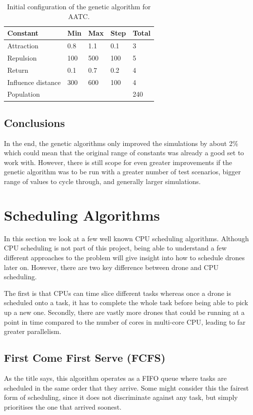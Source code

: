 \documentclass[a4paper,11pt,titlepage]{report}
\begin{document}
\begin{table}[!hbpt]
\centering
\begin{tabular}{|l|l|l|l|l|}
\hline
Constant           & Min & Max & Step & Total \\ \hline
Attraction         & 0.8 & 1.1 & 0.1    & 3     \\ \hline
Repulsion          & 100 & 500 & 100  & 5     \\ \hline
Return             & 0.1 & 0.7 & 0.2  & 4     \\ \hline
Influence distance & 300 & 600 & 100  & 4     \\ \hline
\multicolumn{4}{|l|}{Population}      & 240   \\ \hline
\end{tabular}
\caption{Initial configuration of the genetic algorithm for AATC. \cite{Balaji2017}}
\label{tab:gen_alg}
\end{table}

\subsection{Conclusions}
In the end, the genetic algorithms only improved the simulations by about 2\%\cite{Balaji2017} which could mean that the original range of constants was already a good set to work with. However, there is still scope for even greater improvements if the genetic algorithm was to be run with a greater number of test scenarios, bigger range of values to cycle through, and generally larger simulations.

\section{Scheduling Algorithms}
In this section we look at a few well known CPU scheduling algorithms\cite{Bell2018}. Although CPU scheduling is not part of this project, being able to understand a few different approaches to the problem will give insight into how to schedule drones later on. However, there are two key difference between drone and CPU scheduling.

\newpage
The first is that CPUs can time slice different tasks whereas once a drone is scheduled onto a task, it has to complete the whole task before being able to pick up a new one. Secondly, there are vastly more drones that could be running at a point in time compared to the number of cores in multi-core CPU, leading to far greater parallelism.

\subsection{First Come First Serve (FCFS)}
As the title says, this algorithm operates as a FIFO queue where tasks are scheduled in the same order that they arrive. Some might consider this the fairest form of scheduling, since it does not discriminate against any task, but simply prioritises the one that arrived soonest.
\end{document}
